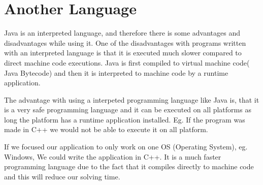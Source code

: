 \section{Another Language}
Java is an interpreted language, and therefore there is some advantages and disadvantages while using it. One of the disadvantages with programs written with an interpreted language is that it is executed much slower compared to direct machine code executions. Java is first compiled to virtual machine code( Java Bytecode) and then it is interpreted to machine code by a runtime application.

The advantage with using a interpeted programming language like Java is, that it is a very safe programming language and it can be executed on all platforms as long the platform has a runtime application installed. Eg. If the program was made in C++ we would not be able to execute it on all platform.

If we focused our application to only work on one OS (Operating System), eg. Windows, We could write the application in C++. It is a much faster programming language due to the fact that it compiles directly to machine code and this will reduce our solving time.